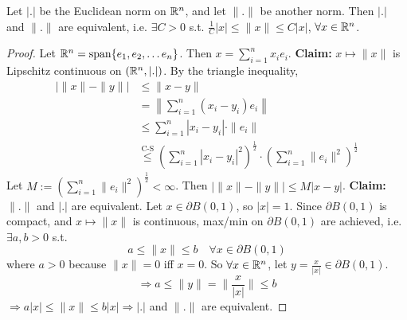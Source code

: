 \begin{prop}
    Let $|. |$ be the Euclidean norm on $\mathbb{R}^n$, and let $\| . \| $ be another norm.
    Then $| . |$ and $\| . \| $ are equivalent, i.e. $\exists C > 0$ s.t.
    $\frac{1}{C} | x |  \leq \| x \| \leq C | x |$, $\forall x \in \mathbb{R}^n$.    
\end{prop}
\begin{proof}
    Let $\mathbb{R}^n = \operatorname{span}\{e_1, e_2, \dots e_n\}$. Then $x = \sum_{i=1}^{n} x_i e_i$.
    \newline\noindent \textbf{Claim:} $x \mapsto \| x \| $ is Lipschitz continuous on
    $(\mathbb{R}^n, |. |)$.
    \newline \noindent By the triangle inequality, 
    \begin{align*}
        \big| \| x \| - \| y \| \big| 
        &\leq \| x - y \| \\
        &= \left\| \sum_{i = 1}^n (x_i - y_i) e_i \right\| \\
        &\leq \sum_{i=1}^{n} | x_i - y_i | \cdot \| e_i \| \\
        &\overset{\text{C-S}}{\leq} \left(\sum_{i=1}^{n} | x_i - y_i |^2 \right)^{\frac{1}{2}} 
        \cdot \left(\sum_{i=1}^{n} \| e_i \|^2 \right)^{\frac{1}{2}}
    \end{align*}
    Let $M := (\sum_{i = 1}^n \| e_i \|^2 )^{\frac{1}{2}} < \infty$.
    Then $\left| \| x \| - \| y \|   \right| \leq M | x - y |$.
    \newline \noindent \textbf{Claim:} $\| . \| $ and $| . | $ are equivalent.
    \newline \noindent Let $x \in \partial B(0, 1)$, so $| x | = 1$. Since $\partial B(0, 1)$ is compact,
    and $x \mapsto \| x \| $ is continuous, max/min on $\partial B(0, 1)$ are achieved, i.e. $
    \exists a,b > 0$ s.t.\[a \leq \| x \| \leq b \quad \forall x \in \partial B(0, 1)\]
    where $a > 0$ because $\| x \| = 0 $ iff $x = 0$.
    So $\forall x \in \mathbb{R}^n$, let $y = \frac{x}{| x |} \in \partial B(0, 1)$.
    \[\Rightarrow a \leq \| y \| = \| \frac{x}{| x | } \| \leq b\]$  \Rightarrow 
    a | x | \leq \| x \| \leq b | x | \Rightarrow |.|$ and $ \| . \|  $ are equivalent.               
\end{proof}

